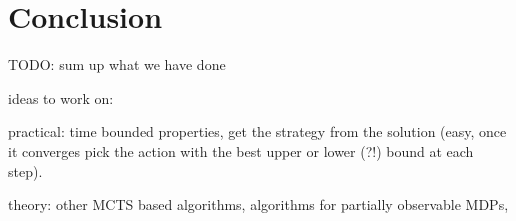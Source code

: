 \chapter{Conclusion}

TODO: sum up what we have done

ideas to work on:

practical:
time bounded properties,
get the strategy from the solution (easy, once it converges pick the
action with the best upper or lower (?!) bound at each step).

theory:
other MCTS based algorithms,
algorithms for partially observable MDPs,
